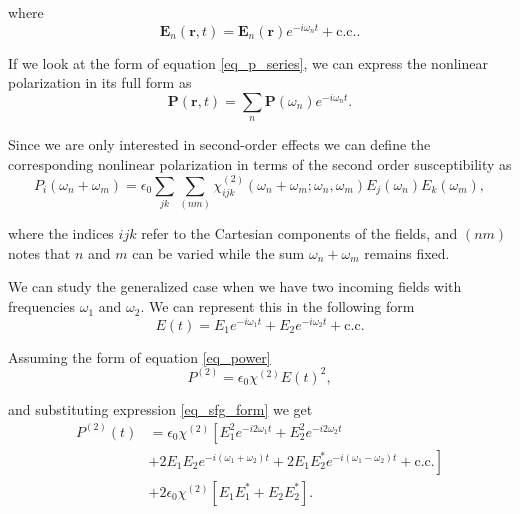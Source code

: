 \documentclass[10pt]{article}
\begin{document}
where
\begin{equation}
\mathbf{E}_{n}(\mathbf{r},t) = \mathbf{E}_{n}(\mathbf{r})e^{-i\omega_{n}t} + \text{c.c.}.
\end{equation}

If we look at the form of equation \eqref{eq_p_series}, we can express the nonlinear polarization in its full form as
\begin{equation}
\mathbf{P}(\mathbf{r},t) = \sum_{n}\mathbf{P}(\omega_{n})e^{-i\omega_{n}t}.
\end{equation}

Since we are only interested in second-order effects we can define the corresponding nonlinear polarization in terms of the second order susceptibility as
\begin{equation}
P_{i}(\omega_{n} + \omega_{m}) = \epsilon_{0}\sum_{jk}\sum_{(nm)}\chi^{(2)}_{ijk}(\omega_{n}+\omega_{m};\omega_{n},\omega_{m})E_{j}(\omega_{n})E_{k}(\omega_{m}),\label{eq_nonlin_p}
\end{equation}

where the indices $ijk$ refer to the Cartesian components of the fields, and $(nm)$ notes that $n$ and $m$ can be varied while the sum $\omega_{n} + \omega_{m}$ remains fixed.

We can study the generalized case when we have two incoming fields with frequencies $\omega_{1}$ and $\omega_{2}$. We can represent this in the following form
\begin{equation}
E(t) = E_{1}e^{-i\omega_{1}t} + E_{2}e^{-i\omega_{2}t} + \text{c.c.}\label{eq_sfg_form}
\end{equation}

Assuming the form of equation \eqref{eq_power}
\begin{equation}
P^{(2)} = \epsilon_{0}\chi^{(2)}E(t)^{2},
\end{equation}

and substituting expression \eqref{eq_sfg_form} we get
\begin{align}
P^{(2)}(t) &= \epsilon_{0}\chi^{(2)}\left[E^{2}_{1}e^{-i2\omega_{1}t} + E^{2}_{2}e^{-i2\omega_{2}t}\right.\nonumber\\
&+\left. 2E_{1}E_{2}e^{-i(\omega_{1}+\omega_{2})t} + 2E_{1}E^{\ast}_{2}e^{-i(\omega_{1}-\omega_{2})t} + \text{c.c.}\right]\nonumber\\
&+ 2\epsilon_{0}\chi^{(2)}\left[E_{1}E^{\ast}_{1} + E_{2}E^{\ast}_{2}\right].\label{eq_second_order}
\end{align}
\end{document}

